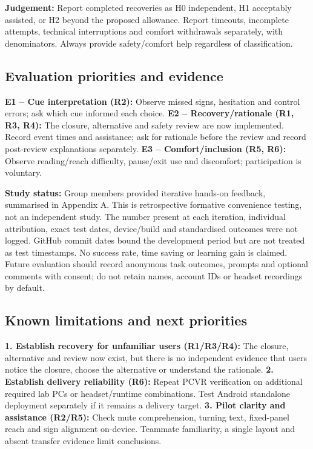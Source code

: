 \documentclass[12pt,a4paper]{article}
\begin{document}
\textbf{Judgement:} Report completed recoveries as H0 independent, H1 acceptably
assisted, or H2 beyond the proposed allowance. Report timeouts, incomplete
attempts, technical interruptions and comfort withdrawals separately, with
denominators. Always provide safety/comfort help regardless of classification.

\subsection{Evaluation priorities and evidence}
\textbf{E1 -- Cue interpretation (R2):} Observe missed signs, hesitation and
control errors; ask which cue informed each choice.
\textbf{E2 -- Recovery/rationale (R1, R3, R4):} The closure, alternative and
safety review are now implemented. Record event times and assistance; ask for
rationale before the review and record post-review explanations separately.
\textbf{E3 -- Comfort/inclusion (R5, R6):} Observe reading/reach difficulty,
pause/exit use and discomfort; participation is voluntary.

\textbf{Study status:} Group members provided iterative hands-on feedback,
summarised in Appendix A. This is retrospective formative convenience testing,
not an independent study. The number present at each iteration, individual
attribution, exact test dates, device/build and standardised outcomes were not
logged. GitHub commit dates bound the development period but are not treated as
test timestamps. No success rate, time saving or learning gain is claimed.
Future evaluation should record anonymous task outcomes, prompts and optional
comments with consent; do not retain names, account IDs or headset recordings
by default.

\subsection{Known limitations and next priorities}
\textbf{1. Establish recovery for unfamiliar users (R1/R3/R4):} The closure,
alternative and review now exist, but there is no independent evidence that
users notice the closure, choose the alternative or understand the rationale.
\textbf{2. Establish delivery reliability (R6):} Repeat PCVR verification on
additional required lab PCs or headset/runtime combinations. Test Android
standalone deployment separately if it remains a delivery target.
\textbf{3. Pilot clarity and assistance (R2/R5):} Check mute comprehension,
turning text, fixed-panel reach and sign alignment on-device. Teammate
familiarity, a single layout and absent transfer evidence limit conclusions.
\end{document}
